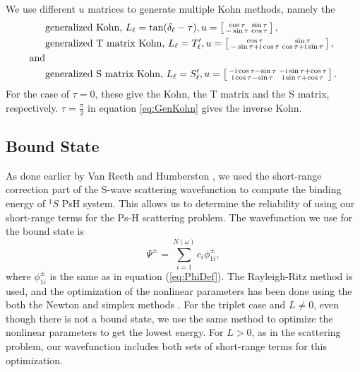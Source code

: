 \documentclass[preprint,showpacs,preprintnumbers,amsmath,amssymb]{revtex4}
\newcommand{\ii}{{\rm{i}}}
\begin{document}

We use different $u$ matrices to generate multiple Kohn methods, namely the
\begin{align}
&\text{generalized Kohn, } L_\ell = \tan(\delta_\ell-\tau), u = \left[ \begin{smallmatrix}
\cos \tau & \sin \tau \\  -\sin \tau & \cos \tau
\end{smallmatrix} \right], \label{eq:GenKohn}\\
&\text{generalized T matrix Kohn, } L_\ell = T_\ell^\prime, u = \left[ \begin{smallmatrix}
\cos\tau & \sin\tau \\ -\sin\tau + \ii \cos\tau & \cos\tau + \ii \sin\tau
\end{smallmatrix} \right], \label{eq:GenTKohn} \\
\text{and}& \nonumber \\
&\text{generalized S matrix Kohn, } L_\ell = S_\ell^\prime, u = \left[ \begin{smallmatrix}
-\ii \cos\tau - \sin\tau & -\ii\sin\tau + \cos\tau \\ \ii\cos\tau - \sin\tau & \ii\sin\tau + \cos\tau
\end{smallmatrix} \right]. \label{eq:GenSKohn}
\end{align}
For the case of $\tau = 0$, these give the Kohn, the T matrix and the S matrix, respectively. $\tau = \frac{\pi}{2}$ in equation \ref{eq:GenKohn} gives the inverse Kohn.


\subsection{Bound State}
As done earlier by Van Reeth and Humberston \cite{VanReeth2003,VanReeth2004}, we used the short-range correction part of the S-wave scattering wavefunction to compute the binding energy of $^1S$ PsH system. This allows us to determine the reliability of using our short-range terms for the Ps-H scattering problem. The wavefunction we use for the bound state is
\begin{equation}
\label{eq:BoundWavefn}
\Psi^\pm = \sum_{i=1}^{N(\omega)} c_i \phi_{1i}^\pm,
\end{equation}
where $\phi_{1i}^\pm$ is the same as in equation (\ref{eq:PhiDef}). The Rayleigh-Ritz method is used, and the optimization of the nonlinear parameters has been done using the both the Newton and simplex methods \cite{Yan1999,GSL}. For the triplet case and $L \neq 0$, even though there is not a bound state, we use the same method to optimize the nonlinear parameters to get the lowest energy. For $L > 0$, as in the scattering problem, our wavefunction includes both sets of short-range terms for this optimization.
\end{document}
